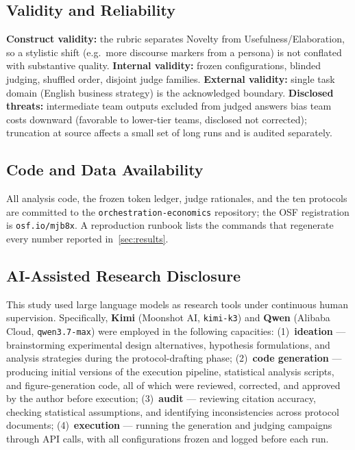 \documentclass[12pt,a4paper]{article}
\begin{document}
\subsection{Validity and Reliability}

\textbf{Construct validity:} the rubric separates Novelty from
Usefulness/Elaboration, so a stylistic shift (e.g.\ more discourse markers from
a persona) is not conflated with substantive quality. \textbf{Internal validity:}
frozen configurations, blinded judging, shuffled order, disjoint judge families.
\textbf{External validity:} single task domain (English business strategy) is
the acknowledged boundary. \textbf{Disclosed threats:} intermediate team outputs
excluded from judged answers bias team costs downward (favorable to lower-tier teams,
disclosed not corrected); truncation at source affects a small set of long runs
and is audited separately.

\subsection{Code and Data Availability}

All analysis code, the frozen token ledger, judge rationales, and the ten
protocols are committed to the \texttt{orchestration-economics} repository; the
OSF registration is \texttt{osf.io/mjb8x}. A reproduction runbook
\citep{SandveEtAl2013} lists the commands that regenerate every number reported
in~\cref{sec:results}.

\subsection{AI-Assisted Research Disclosure}\label{sec:ai-disclosure}

This study used large language models as research tools under continuous human
supervision. Specifically, \textbf{Kimi} (Moonshot AI, \texttt{kimi-k3}) and
\textbf{Qwen} (Alibaba Cloud, \texttt{qwen3.7-max}) were employed in the
following capacities: (1)~\textbf{ideation} --- brainstorming experimental
design alternatives, hypothesis formulations, and analysis strategies during the
protocol-drafting phase; (2)~\textbf{code generation} --- producing initial
versions of the execution pipeline, statistical analysis scripts, and
figure-generation code, all of which were reviewed, corrected, and approved by
the author before execution; (3)~\textbf{audit} --- reviewing citation accuracy,
checking statistical assumptions, and identifying inconsistencies across
protocol documents; (4)~\textbf{execution} --- running the generation and
judging campaigns through API calls, with all configurations frozen and logged
before each run.
\end{document}
